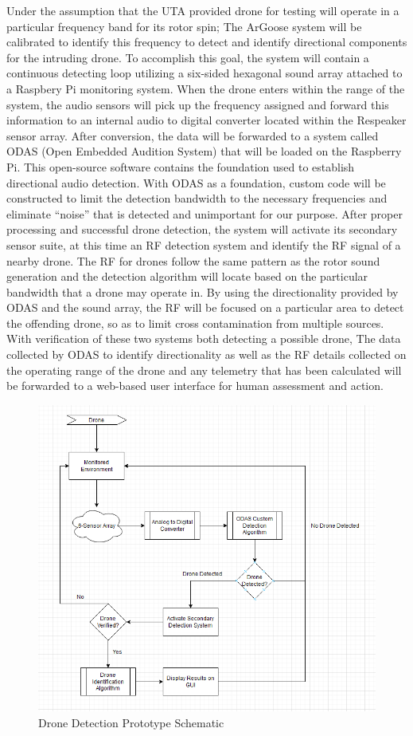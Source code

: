 ﻿Under the assumption that the UTA provided drone for testing will operate in a particular frequency band for its rotor spin; The ArGoose system will be calibrated to identify this frequency to detect and identify directional components for the intruding drone. To accomplish this goal, the system will contain a continuous detecting loop utilizing a six-sided hexagonal sound array attached to a Raspbery Pi monitoring system. When the drone enters within the range of the system, the audio sensors will pick up the frequency assigned and forward this information to an internal audio to digital converter located within the Respeaker sensor array. After conversion, the data will be forwarded to a system called ODAS (Open Embedded Audition System) that will be loaded on the Raspberry Pi. This open-source software contains the foundation used to establish directional audio detection. With ODAS as a foundation, custom code will be constructed to limit the detection bandwidth to the necessary frequencies and eliminate “noise” that is detected and unimportant for our purpose. After proper processing and successful drone detection, the system will activate its secondary sensor suite, at this time an RF detection system and identify the RF signal of a nearby drone. The RF for drones follow the same pattern as the rotor sound generation and the detection algorithm will locate based on the particular bandwidth that a drone may operate in. By using the directionality provided by ODAS and the sound array, the RF will be focused on a particular area to detect the offending drone, so as to limit cross contamination from multiple sources. With verification of these two systems both detecting a possible drone, The data collected by ODAS to identify directionality as well as the RF details collected on the operating range of the drone and any telemetry that has been calculated will be forwarded to a web-based user interface for human assessment and action.
\begin{figure}[h!]
    \centering
    \includegraphics[width=1\textwidth]{images/argoose_schematic.png}
    \caption{Drone Detection Prototype Schematic}
\end{figure}